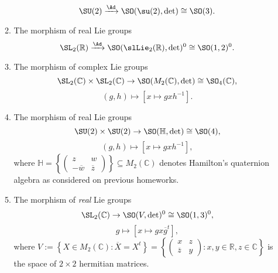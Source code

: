 \documentclass[reqno]{amsart} 
\begin{document}
\begin{homework}
\begin{enumerate}
\begin{enumerate}
\begin{equation*}
        \SU(2) \xrightarrow{\Ad}
        \SO(\su(2),\det)
        \cong 
        \SO(3).
      \end{equation*}
    \item The morphism of real Lie groups
      \begin{equation*}
        \SL_2(\mathbb{R}) \xrightarrow{\Ad}
        \SO(\slLie_2(\mathbb{R}),\det)^0
        \cong 
        \SO(1,2)^0.
      \end{equation*}
    \item The morphism of complex Lie groups
      \begin{equation*}
        \SL_2(\mathbb{C}) \times \SL_2(\mathbb{C}) \rightarrow 
        \SO(M_2(\mathbb{C}),\det)
        \cong \SO_4(\mathbb{C}),
      \end{equation*}
      \begin{equation*}
        (g,h) \mapsto [x \mapsto g x h^{-1}].
      \end{equation*}
    \item The morphism of real Lie groups
      \begin{equation*}
        \SU(2) \times \SU(2)
        \rightarrow 
        \SO(\mathbb{H},\det)
        \cong \SO(4),
      \end{equation*}
      \begin{equation*}
        (g,h) \mapsto [x \mapsto g x h^{-1}],
      \end{equation*}
      where $\mathbb{H} = \left\{ 
\begin{pmatrix}
          z & w \\
          -\overline{w} & \overline{z}
        \end{pmatrix}
 \right\}\subseteq M_2(\mathbb{C})$ denotes
      Hamilton's quaternion algebra as considered on previous homeworks.
    \item The morphism of \emph{real} Lie groups
      \begin{equation*}
        \SL_2(\mathbb{C})
        \rightarrow 
        \SO(V,\det)^0
        \cong \SO(1,3)^0,
      \end{equation*}
      \begin{equation*}
        g \mapsto [x \mapsto g x \overline{g}^t],
      \end{equation*}
      where
      $V 
      := \left\{ X \in M_2(\mathbb{C}) : \overline{X} = X^t
      \right\}
      =
      \left\{ 
\begin{pmatrix}
          x &  z \\
          \overline{z} & y
        \end{pmatrix}
 : x,y \in \mathbb{R}, z \in \mathbb{C}
      \right\}$
      is the space of $2 \times 2$ hermitian matrices.
    \end{enumerate}
  \end{enumerate}
\end{homework}
\end{document}
